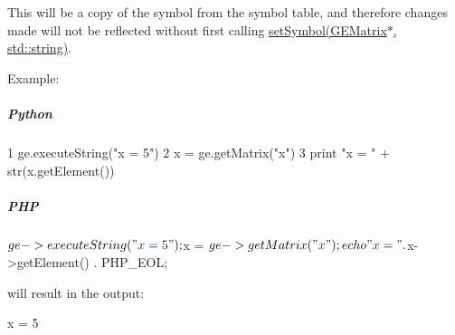 This will be a copy of the symbol from the symbol table, and therefore changes made will not be reflected without first calling \hyperlink{class_g_a_u_s_s_ab51cbcd5a66ba3355f52bf10bf31f7e3}{set\-Symbol(\-G\-E\-Matrix$\ast$, std\-::string)}.

Example\-:

\subparagraph*{Python}


\begin{DoxyCode}
1 ge.executeString(\textcolor{stringliteral}{"x = 5"})
2 x = ge.getMatrix(\textcolor{stringliteral}{"x"})
3 \textcolor{keywordflow}{print} \textcolor{stringliteral}{"x = "} + str(x.getElement())
\end{DoxyCode}


\subparagraph*{P\-H\-P}


\begin{DoxyCode}
$ge->executeString(\textcolor{stringliteral}{"x = 5"});
$x = $ge->getMatrix(\textcolor{stringliteral}{"x"});
echo \textcolor{stringliteral}{"x = "} . $x->getElement() . PHP\_EOL;
\end{DoxyCode}
 will result in the output\-: 
\begin{DoxyCode}
x = 5
\end{DoxyCode}



